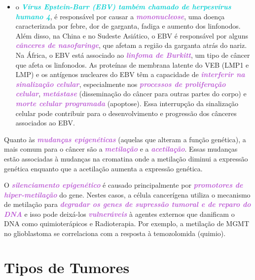 \documentclass[11pt,a4paper]{article}
\newcounter{exemplo}
\begin{document}
\begin{itemize}[label=\textcolor{CarnationPink}{$\blacktriangleright$}]
        \item o \textcolor{DarkTurquoise}{\textbf{\textit{Vírus Epstein-Barr (EBV) também chamado de herpesvírus humano 4}}}, é responsável por causar a \textcolor{MediumOrchid}{\textbf{\textit{mononucleose}}}, uma doença caracterizada por febre, dor de garganta, fadiga e aumento dos linfonodos. Além disso, na China e no Sudeste Asiático, o EBV é responsável por alguns \textcolor{MediumOrchid}{\textbf{\textit{cânceres de nasofaringe}}}, que afetam a região da garganta atrás do nariz. Na África, o EBV está associado ao \textcolor{MediumOrchid}{\textbf{\textit{linfoma de Burkitt}}}, um tipo de câncer que afeta os linfonodos. As proteínas de membrana latente do VEB (LMP1 e LMP) e os antígenos nucleares do EBV têm a capacidade de \textcolor{MediumOrchid}{\textbf{\textit{interferir na sinalização celular}}}, especialmente nos \textcolor{MediumOrchid}{\textbf{\textit{processos de proliferação celular}}}, \textcolor{MediumOrchid}{\textbf{\textit{metástase}}} (disseminação do câncer para outras partes do corpo) e \textcolor{MediumOrchid}{\textbf{\textit{morte celular programada}}} (apoptose). Essa interrupção da sinalização celular pode contribuir para o desenvolvimento e progressão dos cânceres associados ao EBV.
    \end{itemize}

    Quanto às \textcolor{MediumOrchid}{\textbf{\textit{mudanças epigenéticas}}} (aquelas que alteram a função genética), a mais comum para o câncer são a \textcolor{MediumOrchid}{\textbf{\textit{metilação}}} e a \textcolor{MediumOrchid}{\textbf{\textit{acetilação}}}. Essas mudanças estão associadas à mudanças na cromatina onde a metilação diminui a expressão genética enquanto que a acetilação aumenta a expressão genética.
    
    O \textcolor{MediumOrchid}{\textbf{\textit{silenciamento epigenético}}} é causado principalmente por \textcolor{MediumOrchid}{\textbf{\textit{promotores de hiper-metilação}}} do gene. Nestes casos, a célula cancerígena utiliza o mecanismo de metilação para \textcolor{MediumOrchid}{\textbf{\textit{degradar os genes de supressão tumoral e de reparo do DNA}}} e isso pode deixá-los \textcolor{MediumOrchid}{\textbf{\textit{vulneráveis}}} à agentes externos que danificam o DNA como quimioterápicos e Radioterapia. Por exemplo, a metilação de MGMT no glioblastoma se correlaciona com a resposta à temozolomida (quimio).

\section{Tipos de Tumores}
\end{document}
